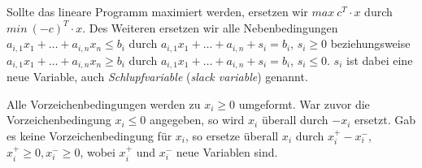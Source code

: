 \begin{Bew}
  \hspace{\parindent}Sollte das lineare Programm maximiert werden, ersetzen wir $max~c^T \cdot x$ durch $min~(-c)^T \cdot x$.
  Des Weiteren ersetzen wir alle Nebenbedingungen $a_{i,1} x_1 + \ldots + a_{i, n} x_n \le b_i$ durch $a_{i,1} x_1 + \ldots + a_{i,n} + s_i = b_i$, $s_i \ge 0$ beziehungsweise $a_{i,1} x_1 + \ldots + a_{i, n} x_n \ge b_i$ durch $a_{i,1} x_1 + \ldots + a_{i,n} + s_i = b_i$, $s_i \le 0$.
  $s_i$ ist dabei eine neue Variable, auch \textit{Schlupfvariable} (\textit{slack variable}) genannt.
  
  Alle Vorzeichenbedingungen werden zu $x_i \ge 0$ umgeformt. War zuvor die Vorzeichenbedingung $x_i \le 0$ angegeben, so wird $x_i$ überall durch $-x_i$ ersetzt. Gab es keine Vorzeichenbedingung für $x_i$, so ersetze überall $x_i$ durch $x_i^+ - x_i^-$, $x_i^+ \ge 0, x_i^- \ge 0$, wobei $x_i^+$ und $x_i^-$ neue Variablen sind.
\end{Bew}

